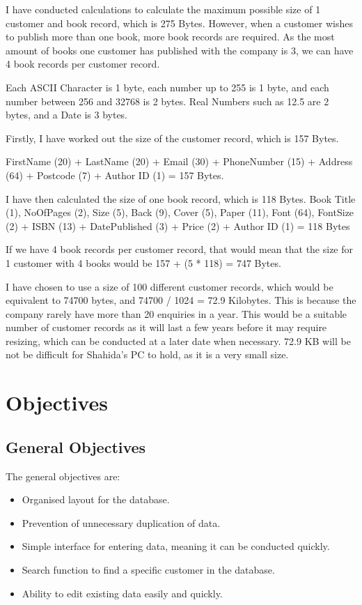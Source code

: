 I have conducted calculations to calculate the maximum  possible size of 1 customer and book record, which is 275 Bytes. However, when a customer wishes to publish more than one book, more book records are required. As the most amount of books one customer has published with the company is 3, we can have 4 book records per customer record.

Each ASCII Character is 1 byte, each number up to 255 is 1 byte, and each number between 256 and 32768 is 2 bytes. Real Numbers such as 12.5 are 2 bytes, and a Date is 3 bytes.

Firstly, I have worked out the size of the customer record, which is 157 Bytes.

FirstName (20) + LastName (20) + Email (30) + PhoneNumber (15) + Address (64) + Postcode (7) + Author ID (1) = 157 Bytes.

I have then calculated the size of one book record, which is 118 Bytes.
Book Title (1), NoOfPages (2), Size (5), Back (9), Cover (5), Paper (11), Font (64), FontSize (2) + ISBN (13) + DatePublished (3) + Price (2) + Author ID (1) = 118 Bytes

If we have 4 book records per customer record, that would mean that the size for 1 customer with 4 books would be 157 + (5 * 118) = 747 Bytes.

I have chosen to use a size of 100 different customer records, which would be equivalent to 74700 bytes, and 74700 / 1024 = 72.9 Kilobytes. This is because the company rarely have more than 20 enquiries in a year. This would be a suitable number of customer records as it will last a few years before it may require resizing, which can be conducted at a later date when necessary. 72.9 KB will be not be difficult for Shahida's PC to hold, as it is a very small size.

\section{Objectives}

\subsection{General Objectives}

The general objectives are:
\begin{itemize}
    \item Organised layout for the database.
    \item Prevention of unnecessary duplication of data.
    \item Simple interface for entering data, meaning it can be conducted quickly.
    \item Search function to find a specific customer in the database.
    \item Ability to edit existing data easily and quickly.
\end{itemize}

